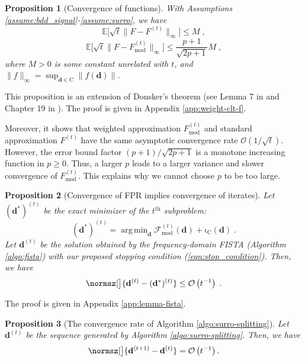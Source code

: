 \documentclass[final]{siamart1116}
\newcommand{\mb}[1]{\mathbf{#1}}
\DeclareMathOperator*{\argmin}{arg\,min}
\def \co {\mathcal{O}}
\def \E  {\mathbb{E}}
\def \F  {\mathcal{F}}
\newtheorem{prop}{Proposition}
\begin{document}
\begin{prop}[Convergence of functions]
\label{lemma:weight}With Assumptions \ref{assume:bdd_signal}-\ref{assume:surro}, we have
\begin{equation}
\label{eqn:donsker}
\E\Big[\sqrt{t}\big\|F - F^{(t)}\big\|_{\infty}\Big] \leq M \;,
\end{equation}
\begin{equation}
\label{eqn:weight-clt-f}
\E\Big[\sqrt{t}\big\|F - F^{(t)}_{\mathrm{mod}}\big\|_{\infty}\Big] \leq \frac{p+1}{\sqrt{2p+1}}M \;,
\end{equation}
where $M>0$ is some constant unrelated with $t$, and $\|f\|_{\infty} = \sup_{\mb{d}\in\text{C}}\|f(\mb{d})\|$.
\end{prop}

This proposition is an extension of Donsker's theorem (see Lemma 7 in \cite{mairal-2010-online} and Chapter 19 in \cite{van2000asymptotic}). The proof is given in Appendix \ref{app:weight-clt-f}.

Moreover, it shows that weighted approximation $F^{(t)}_{\mathrm{mod}}$ and standard approximation $F^{(t)}$ have the same asymptotic convergence rate $\co(1/\sqrt{t})$. However, the error bound factor $(p+1)/\sqrt{2p+1}$ is a monotone increasing function in $p\geq0$. Thus, a larger $p$ leads to a larger variance and slower convergence of $F^{(t)}_{\mathrm{mod}}$. This explains why we cannot choose $p$ to be too large.

\begin{prop}[Convergence of FPR implies convergence of iterates]
\label{lemma:fista} Let $(\mb{d}^*)^{(t)}$ be the exact minimizer of the $t^{\text{th}}$ subproblem:
\begin{equation}
\label{eqn:exact-t}
(\mb{d}^*)^{(t)} = \argmin_{\mb{d}}\F^{(t)}_{\mathrm{mod}}(\mb{d}) + \iota_{\text{C}}(\mb{d}) \;.
\end{equation}
Let $\mb{d}^{(t)}$ be the solution obtained by the frequency-domain FISTA (Algorithm \ref{algo:fista}) with our proposed stopping condition (\ref{eqn:stop_condition}). Then, we have
\begin{equation}
\label{eqn:fpr_bdd}
\normsz[\big]{\mb{d}^{(t)}-(\mb{d}^*)^{(t)}} \leq \co\left(t^{-1} \right) \;.
\end{equation}
\end{prop}

The proof is given in Appendix \ref{app:lemma-fista}.

\begin{prop}[The convergence rate of Algorithm \ref{algo:surro-splitting}]
\label{lemma:d_residual} Let $\mb{d}^{(t)}$ be the sequence generated by Algorithm \ref{algo:surro-splitting}. Then, we have
\begin{equation}
\label{eqn:d_residual}
\normsz[\big]{\mb{d}^{(t+1)}-\mb{d}^{(t)}} = \co\left(t^{-1}\right).
\end{equation}
\end{prop}
\end{document}
